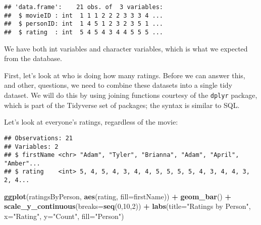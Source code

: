 \documentclass[]{article}
\newenvironment{Shaded}{\begin{snugshade}}{\end{snugshade}}
\newcommand{\KeywordTok}[1]{\textcolor[rgb]{0.13,0.29,0.53}{\textbf{#1}}}
\newcommand{\DataTypeTok}[1]{\textcolor[rgb]{0.13,0.29,0.53}{#1}}
\newcommand{\DecValTok}[1]{\textcolor[rgb]{0.00,0.00,0.81}{#1}}
\newcommand{\StringTok}[1]{\textcolor[rgb]{0.31,0.60,0.02}{#1}}
\newcommand{\CommentTok}[1]{\textcolor[rgb]{0.56,0.35,0.01}{\textit{#1}}}
\newcommand{\OperatorTok}[1]{\textcolor[rgb]{0.81,0.36,0.00}{\textbf{#1}}}
\newcommand{\NormalTok}[1]{#1}
\begin{document}
\begin{verbatim}
## 'data.frame':    21 obs. of  3 variables:
##  $ movieID : int  1 1 1 2 2 2 3 3 3 4 ...
##  $ personID: int  1 4 5 1 2 3 2 3 5 1 ...
##  $ rating  : int  5 4 5 4 3 4 4 5 5 5 ...
\end{verbatim}

We have both int variables and character variables, which is what we
expected from the database.

First, let's look at who is doing how many ratings. Before we can answer
this, and other, questions, we need to combine these datasets into a
single tidy dataset. We will do this by using joining functions courtesy
of the \texttt{dplyr} package, which is part of the Tidyverse set of
packages; the syntax is similar to SQL.

Let's look at everyone's ratings, regardless of the movie:

\begin{Shaded}
\end{Shaded}

\begin{verbatim}
## Observations: 21
## Variables: 2
## $ firstName <chr> "Adam", "Tyler", "Brianna", "Adam", "April", "Amber"...
## $ rating    <int> 5, 4, 5, 4, 3, 4, 4, 5, 5, 5, 5, 4, 3, 4, 4, 3, 2, 4...
\end{verbatim}

\begin{Shaded}
\begin{Highlighting}[]
\KeywordTok{ggplot}\NormalTok{(ratingsByPerson, }\KeywordTok{aes}\NormalTok{(rating, }\DataTypeTok{fill=}\NormalTok{firstName)) }\OperatorTok{+}\StringTok{ }\KeywordTok{geom_bar}\NormalTok{() }\OperatorTok{+}\StringTok{ }\KeywordTok{scale_y_continuous}\NormalTok{(}\DataTypeTok{breaks=}\KeywordTok{seq}\NormalTok{(}\DecValTok{0}\NormalTok{,}\DecValTok{10}\NormalTok{,}\DecValTok{2}\NormalTok{)) }\OperatorTok{+}\StringTok{ }\KeywordTok{labs}\NormalTok{(}\DataTypeTok{title=}\StringTok{"Ratings by Person"}\NormalTok{, }\DataTypeTok{x=}\StringTok{"Rating"}\NormalTok{, }\DataTypeTok{y=}\StringTok{"Count"}\NormalTok{, }\DataTypeTok{fill=}\StringTok{"Person"}\NormalTok{)}
\end{Highlighting}
\end{Shaded}
\end{document}
